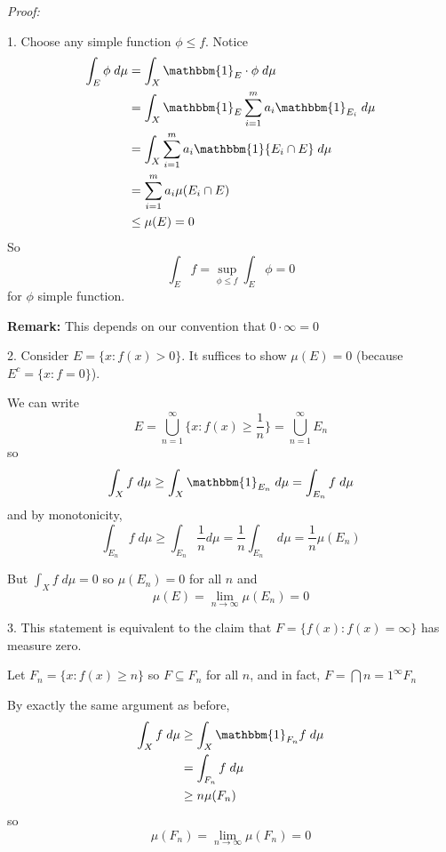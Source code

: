 \documentclass[12pt]{report}
\newcommand{\ind}{\mathbbm{1}}
\newcommand{\sub}{\subseteq}
\newcommand*{\tbf}[1]{\ifmmode\mathbf{#1}\else\textbf{#1}\fi}
\newenvironment*{tbox}[2][gray]{
    \begin{tcolorbox}[
        parbox=false,
        colback=#1!5!white,
        colframe=#1!75!black,
        breakable,
        title={#2}
    ]}
    {\end{tcolorbox}}
\begin{document}
    \begin{tbox}{\textbf{Lemma:}
        \begin{enumerate}
            \item If $\mu(E) = 0$, then $\int_E f = 0$ for any $f \geq 0$ 
            \item If $\int_X f\; d\mu = 0$ for $f \geq 0$, then $f = 0$ almost everywhere
            \item If $\int_X f\; d\mu < \infty$, then $f < \infty$ almost everywhere
        \end{enumerate} }
        \emph{Proof:} 

        1. Choose any simple function $\phi \leq f$. Notice 
        \begin{align*}
            \int_E \phi \; d\mu &= \int_X \ind_E \cdot \phi \; d\mu\\ 
                &= \int_X \ind_E \sum_{i=1}^{m} a_i \ind_{E_i} \; d\mu\\ 
                &= \int_X \sum_{i=1}^{m} a_i \ind{E_i \cap E}\; d\mu\\ 
                &= \sum_{i=1}^{m} a_i \mu(E_i \cap E)\\
                &\leq \mu(E) = 0
        \end{align*}
        So 
        \[\int_E f = \sup_{\phi \leq f} \int_E \phi = 0\]
        for $\phi$ simple function.

        \tbf{Remark:} This depends on our convention that $0 \cdot \infty = 0$

        2. Consider $E = \{x: f(x)> 0\}$. It suffices to show $\mu(E) = 0$ (because $E^c = \{x: f = 0\}$). 

        We can write 
        \[E = \bigcup_{n=1}^\infty \{x: f(x) \geq \frac{1}{n}\} = \bigcup_{n=1}^\infty E_n\]
        so 
        \[\int_X f \; d\mu \geq \int_X \ind_{E_n} \; d\mu = \int_{E_n} f\; d\mu\]
        and by monotonicity, 
        \[\int_{E_n} f\; d\mu \geq \int_{E_n} \frac{1}{n} d\mu = \frac{1}{n} \int_{E_n} \; d\mu = \frac{1}{n}\mu(E_n)\]

        But $\int_X f\; d\mu = 0$ so $\mu(E_n) = 0$ for all $n$ and 
        \[\mu(E) = \lim_{n \to\infty} \mu(E_n) = 0\]

        3. This statement is equivalent to the claim that $F = \{f(x): f(x) = \infty\}$ has measure zero.

        Let $F_n = \{x: f(x) \geq n\}$ so $F \sub F_n$ for all $n$, and in fact, $F = \bigcap{n=1}^{\infty} F_n$

        By exactly the same argument as before, 
        \begin{align*}
            \int_X f\; d\mu &\geq \int_X \ind_{F_n} f\; d\mu\\ 
            &= \int_{F_n} f\; d\mu \\ 
            &\geq n \mu(F_n) 
        \end{align*}
        so 
        \[\mu(F_n) = \lim_{n \to \infty} \mu(F_n) = 0\]
    \end{tbox}
\end{document}
